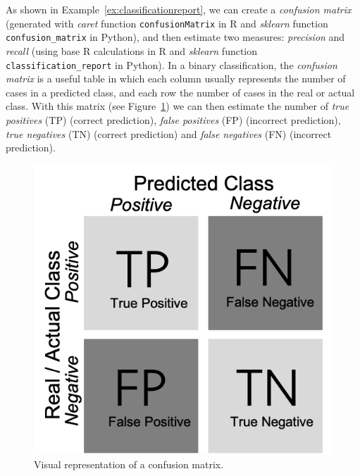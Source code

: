 
As shown in Example~\ref{ex:classificationreport}, we can create a \emph{confusion matrix} (generated with \emph{caret} function \texttt{confusionMatrix} in R and \emph{sklearn} function \texttt{confusion\_matrix} in Python), and then estimate two measures: \emph{precision} and \emph{recall} (using base R calculations in R and \emph{sklearn} function \texttt{classification\_report} in Python). In a binary classification, the \emph{confusion matrix} is a useful table in which each column usually represents the number of cases in a predicted class, and each row the number of cases in the real or actual class. With this matrix (see Figure~\ref{fig:matrix}) we can then estimate the number of \emph{true positives} (TP) (correct prediction), \emph{false positives} (FP) (incorrect prediction), \emph{true negatives} (TN) (correct prediction) and \emph{false negatives} (FN) (incorrect prediction).


\begin{figure}
\centering
\includegraphics[width=\linewidth]{figures/ch09_matrix}
\caption{Visual representation of a confusion matrix.}
\label{fig:matrix}
\end{figure}

